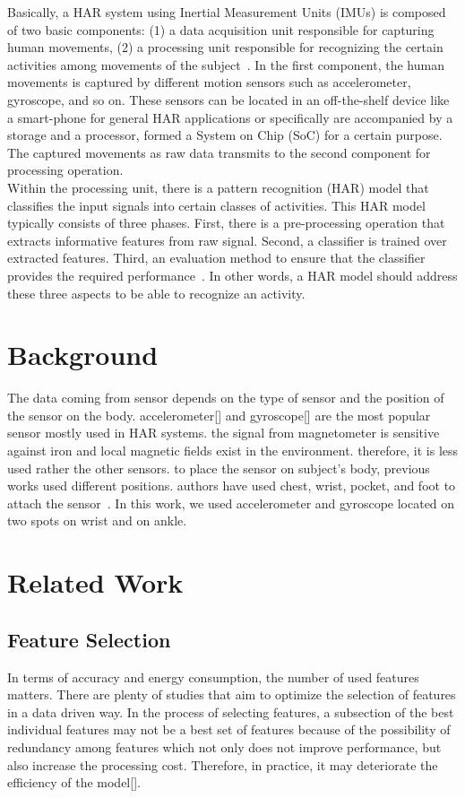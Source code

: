 \documentclass[journal,article,submit,moreauthors,pdftex]{Definitions/mdpi}
\begin{document}
Basically, a HAR system using Inertial Measurement Units (IMUs) is composed of two basic components: (1) a data acquisition unit responsible for capturing human movements, (2) a processing unit responsible for recognizing the certain activities among movements of the subject~\cite{rosati2018comparison}. In the first component, the human movements is captured by different motion sensors such as accelerometer, gyroscope, and so on. These sensors can be located in an off-the-shelf device like a smart-phone for general HAR applications or specifically are accompanied by a storage and a processor, formed a System on Chip (SoC) for a certain purpose. The captured movements as raw data transmits to the second component for processing operation.\\
Within the processing unit, there is a pattern recognition (HAR) model that classifies the input signals into certain classes of activities. This HAR model typically consists of three phases. First, there is a pre-processing operation that extracts informative features from raw signal. Second, a classifier is trained over extracted features. Third, an evaluation method to ensure that the classifier provides the required performance~\cite{kolodziej2019registration}. In other words, a HAR model should address these three aspects to be able to recognize an activity.

\section{Background}
The data coming from sensor depends on the type of sensor and the position of the sensor on the body.
accelerometer[] and gyroscope[] are the most popular sensor mostly used in HAR systems. the signal from magnetometer is sensitive against iron and local magnetic fields exist in the environment. therefore, it is less used rather the other sensors. to place the sensor on subject's body, previous works used different positions. authors have used chest, wrist, pocket, and foot to attach the sensor~\cite{hassan2018robust, morris2014recofit, s140610146, wang2019survey}. In this work, we used accelerometer and gyroscope located on two spots on wrist and on ankle.

\section{Related Work}

\subsection{Feature Selection}
In terms of accuracy and energy consumption, the number of used features matters. There are plenty of studies that aim to optimize the selection of features in a data driven way. In the process of selecting features, a subsection of the best individual features may not be a best set of features because of the possibility of redundancy among features which not only does not improve performance, but also increase the processing cost. Therefore, in practice, it may deteriorate the efficiency of the model[].%
\end{document}
